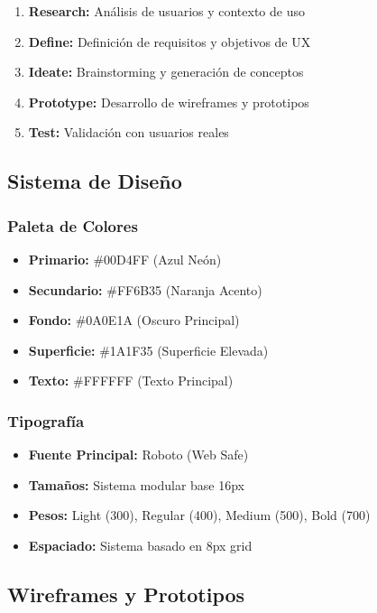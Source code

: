 \documentclass[12pt,a4paper]{article}
\begin{document}
\begin{enumerate}
    \item \textbf{Research:} Análisis de usuarios y contexto de uso
    \item \textbf{Define:} Definición de requisitos y objetivos de UX
    \item \textbf{Ideate:} Brainstorming y generación de conceptos
    \item \textbf{Prototype:} Desarrollo de wireframes y prototipos
    \item \textbf{Test:} Validación con usuarios reales
\end{enumerate}

\subsection{Sistema de Diseño}

\subsubsection{Paleta de Colores}

\begin{itemize}
    \item \textbf{Primario:} \#00D4FF (Azul Neón)
    \item \textbf{Secundario:} \#FF6B35 (Naranja Acento)
    \item \textbf{Fondo:} \#0A0E1A (Oscuro Principal)
    \item \textbf{Superficie:} \#1A1F35 (Superficie Elevada)
    \item \textbf{Texto:} \#FFFFFF (Texto Principal)
\end{itemize}

\subsubsection{Tipografía}

\begin{itemize}
    \item \textbf{Fuente Principal:} Roboto (Web Safe)
    \item \textbf{Tamaños:} Sistema modular base 16px
    \item \textbf{Pesos:} Light (300), Regular (400), Medium (500), Bold (700)
    \item \textbf{Espaciado:} Sistema basado en 8px grid
\end{itemize}

\subsection{Wireframes y Prototipos}
\end{document}
